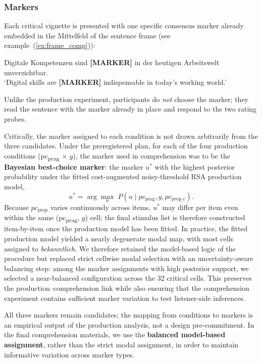 \documentclass[12pt]{article}
\begin{document}
\subsubsection{Markers}

Each critical vignette is presented with one specific consensus marker
already embedded in the Mittelfeld of the sentence frame (see
example~(\ref{ex:frame_comp})):

\begin{exe}
  \ex \label{ex:frame_comp}
  Digitale Kompetenzen sind \textbf{[MARKER]}
  in der heutigen Arbeitswelt unverzichtbar.\\
  `Digital skills are \textbf{[MARKER]} indispensable in today's
  working world.'
\end{exe}

Unlike the production experiment, participants do \emph{not} choose the
marker; they read the sentence with the marker already in place and respond
to the two rating probes.

Critically, the marker assigned to each condition is not drawn arbitrarily
from the three candidates. Under the preregistered plan, for each of the four
production conditions (pc\textsubscript{prag} $\times$ $g$), the marker used in
comprehension was to be the \textbf{Bayesian best-choice marker}: the marker
$u^*$ with the highest posterior probability under the fitted
cost-augmented noisy-threshold RSA production model,
\[
u^* = \arg\max_{u} \; P(u \mid pc_{\mathrm{prag}}, g,
                           pc_{\mathrm{prop}\_c}).
\]
Because $pc_{\mathrm{prop}}$ varies continuously across items,
$u^*$ may differ per item even within the same
(pc\textsubscript{prag}, $g$) cell; the final stimulus list is therefore
constructed item-by-item once the production model has been fitted.
In practice, the fitted production model yielded a nearly degenerate modal map,
with most cells assigned to \textit{bekanntlich}. We therefore retained the
model-based logic of the procedure but replaced strict cellwise modal selection
with an uncertainty-aware balancing step: among the marker assignments with
high posterior support, we selected a near-balanced configuration across the 32
critical cells. This preserves the production--comprehension link while also
ensuring that the comprehension experiment contains sufficient marker variation
to test listener-side inferences.

All three markers remain candidates; the mapping from conditions to
markers is an empirical output of the production analysis, not a design
pre-commitment. In the final comprehension materials, we use the
\textbf{balanced model-based assignment}, rather than the strict modal
assignment, in order to maintain informative variation across marker types.
\end{document}
